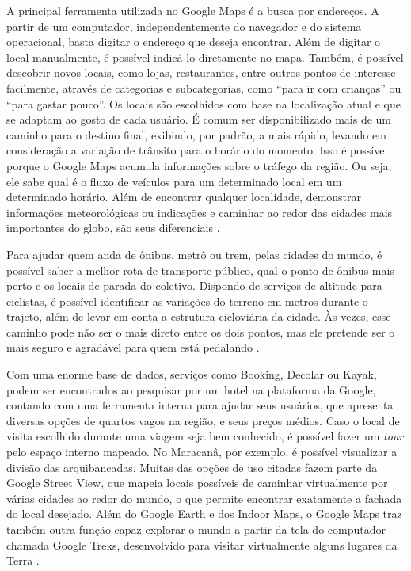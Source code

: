 A principal ferramenta utilizada no Google Maps é a busca por endereços. A partir de um computador, independentemente do navegador e do sistema operacional, basta digitar o endereço que deseja encontrar. Além de digitar o local manualmente, é possível indicá-lo diretamente no mapa. Também, é possível descobrir novos locais, como lojas, restaurantes, entre outros pontos de interesse facilmente, através de categorias e subcategorias, como “para ir com crianças” ou “para gastar pouco”. Os locais são escolhidos com base na localização atual e que se adaptam ao gosto de cada usuário. É comum ser disponibilizado mais de um caminho para o destino final, exibindo, por padrão, a mais rápido, levando em consideração a variação de trânsito para o horário do momento. Isso é possível porque o Google Maps acumula informações sobre o tráfego da região. Ou seja, ele sabe qual é o fluxo de veículos para um determinado local em um determinado horário. Além de encontrar qualquer localidade, demonstrar informações meteorológicas ou indicações e caminhar ao redor das cidades mais importantes do globo, são seus diferenciais \cite{google:2019}.


Para ajudar quem anda de ônibus, metrô ou trem, pelas cidades do mundo, é possível saber a melhor rota de transporte público, qual o ponto de ônibus mais perto e os locais de parada do coletivo. Dispondo de serviços de altitude para ciclistas, é possível identificar as variações do terreno em metros durante o trajeto, além de levar em conta a estrutura cicloviária da cidade. Às vezes, esse caminho pode não ser o mais direto entre os dois pontos, mas ele pretende ser o mais seguro e agradável para quem está pedalando \cite{google:2019}.

Com uma enorme base de dados, serviços como Booking, Decolar ou Kayak, podem ser encontrados ao pesquisar por um hotel na plataforma da Google, contando com uma ferramenta interna para ajudar seus usuários, que apresenta diversas opções de quartos vagos na região, e seus preços médios. Caso o local de visita escolhido durante uma viagem seja bem conhecido, é possível fazer um \textit{tour} pelo espaço interno mapeado. No Maracanâ, por exemplo, é possível visualizar a divisão das arquibancadas. Muitas das opções de uso citadas fazem parte da Google Street View, que mapeia locais possíveis de caminhar virtualmente por várias cidades ao redor do mundo, o que permite encontrar exatamente a fachada do local desejado. Além do Google Earth e dos Indoor Maps, o Google Maps traz também outra função capaz explorar o mundo a partir da tela do computador chamada Google Treks, desenvolvido para visitar virtualmente alguns lugares da Terra \cite{google:2019}.

